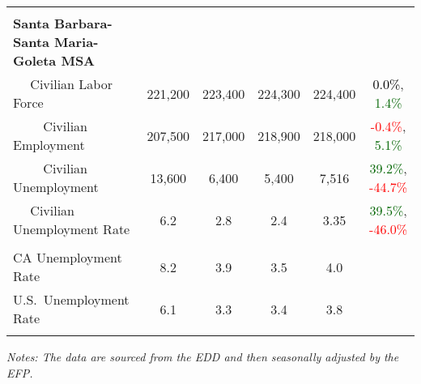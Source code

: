 \documentclass[12pt]{article}
\begin{document}
\begin{landscape}
\begin{table}
\begin{tabular}{|l|c|c|c|c|c|}
&&&&& \\
\textbf{Santa Barbara-Santa Maria-Goleta MSA} &&&&& \\
$\quad$ Civilian Labor Force &221,200 & 223,400 & 224,300 & 224,400 & \textcolor{black}{0.0\%}, \textcolor{darkgreen}{1.4\%} \\
$\qquad$ \small Civilian Employment &207,500 & 217,000 & 218,900 & 218,000 & \textcolor{red}{-0.4\%}, \textcolor{darkgreen}{5.1\%} \\
$\qquad$ \small Civilian Unemployment &13,600 & 6,400 & 5,400 & 7,516 & \textcolor{darkgreen}{39.2\%}, \textcolor{red}{-44.7\%} \\
$\quad$ Civilian Unemployment Rate &6.2 & 2.8 & 2.4 & 3.35 & \textcolor{darkgreen}{39.5\%}, \textcolor{red}{-46.0\%} \\
&&&&& \\
CA Unemployment Rate & 8.2 & 3.9 & 3.5 & 4.0 & \\
U.S.\ Unemployment Rate & 6.1 & 3.3 & 3.4 & 3.8 & \\
& & & & & \\ \hline \hline
\end{tabular}
\par
\vspace{.5em}
\footnotesize
\textit{Notes: The data are sourced from the EDD and then seasonally adjusted by the EFP.}
\end{table}
\end{landscape}
\end{document}
